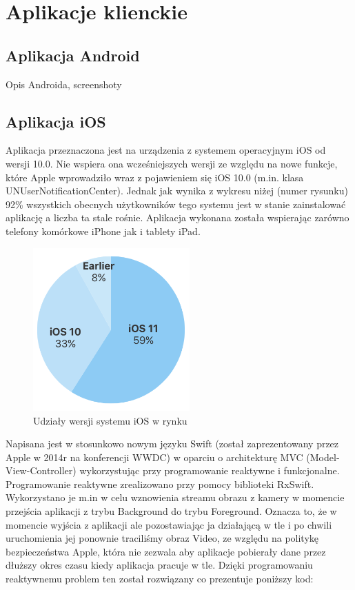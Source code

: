 \chapter{Aplikacje klienckie}

\section*{Aplikacja Android}

Opis Androida, screenshoty


\section*{Aplikacja iOS}
Aplikacja przeznaczona jest na urządzenia z systemem operacyjnym iOS od wersji 10.0. 
Nie wspiera ona wcześniejszych wersji ze względu na nowe funkcje, które Apple wprowadziło wraz z pojawieniem się iOS 10.0 (m.in. klasa UNUserNotificationCenter). Jednak jak wynika z wykresu niżej (numer rysunku) 92\% wszystkich obecnych użytkowników tego systemu jest w stanie zainstalować aplikację a liczba ta stale rośnie. Aplikacja wykonana została wspierając zarówno telefony komórkowe iPhone jak i tablety iPad. 
\begin{figure}[h]
	\centering
	\includegraphics[width=6cm]{iOSstat}
	\caption{Udziały wersji systemu iOS w rynku}
\end{figure}
Napisana jest w stosunkowo nowym języku Swift (został zaprezentowany przez Apple w 2014r na konferencji WWDC) w oparciu o architekturę MVC (Model-View-Controller) wykorzystując przy programowanie reaktywne i funkcjonalne. 
Programowanie reaktywne zrealizowano przy pomocy biblioteki RxSwift. Wykorzystano je m.in w celu wznowienia streamu obrazu z kamery w momencie przejścia aplikacji z trybu Background do trybu Foreground. Oznacza to, że w momencie wyjścia z aplikacji ale pozostawiając ja działającą w tle i po chwili uruchomienia jej ponownie traciliśmy obraz Video, ze względu na politykę bezpieczeństwa Apple, która nie zezwala aby aplikacje pobierały dane przez dłuższy okres czasu kiedy aplikacja pracuje w tle. Dzięki programowaniu reaktywnemu problem ten został rozwiązany co prezentuje poniższy kod:
